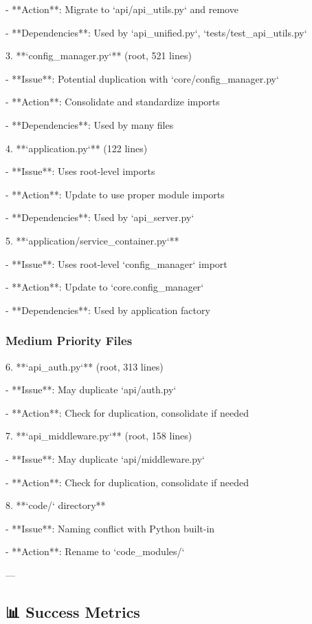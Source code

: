\documentclass[11pt,a4paper]{article}
\begin{document}
   - **Action**: Migrate to `api/api\_utils.py` and remove

   - **Dependencies**: Used by `api\_unified.py`, `tests/test\_api\_utils.py`

3. **`config\_manager.py`** (root, 521 lines)

   - **Issue**: Potential duplication with `core/config\_manager.py`

   - **Action**: Consolidate and standardize imports

   - **Dependencies**: Used by many files

4. **`application.py`** (122 lines)

   - **Issue**: Uses root-level imports

   - **Action**: Update to use proper module imports

   - **Dependencies**: Used by `api\_server.py`

5. **`application/service\_container.py`**

   - **Issue**: Uses root-level `config\_manager` import

   - **Action**: Update to `core.config\_manager`

   - **Dependencies**: Used by application factory

\subsubsection{Medium Priority Files}

6. **`api\_auth.py`** (root, 313 lines)

   - **Issue**: May duplicate `api/auth.py`

   - **Action**: Check for duplication, consolidate if needed

7. **`api\_middleware.py`** (root, 158 lines)

   - **Issue**: May duplicate `api/middleware.py`

   - **Action**: Check for duplication, consolidate if needed

8. **`code/` directory**

   - **Issue**: Naming conflict with Python built-in

   - **Action**: Rename to `code\_modules/`

---

\subsection{📊 Success Metrics}
\end{document}
